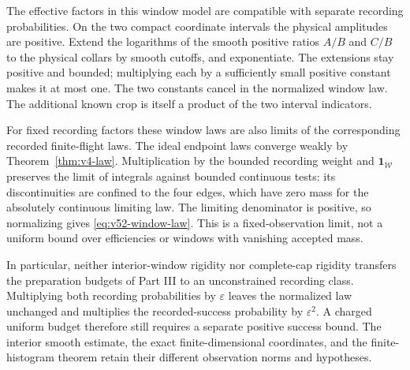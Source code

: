 The effective factors in this window model are compatible with separate
recording probabilities.  On the two compact coordinate intervals the
physical amplitudes are positive.  Extend the logarithms of the smooth
positive ratios $A/B$ and $C/B$ to the physical collars by smooth cutoffs,
and exponentiate.  The extensions stay positive and bounded; multiplying
each by a sufficiently small positive constant makes it at most one.
The two constants cancel in the normalized window law.  The additional
known crop is itself a product of the two interval indicators.

For fixed recording factors these window laws are also limits of the
corresponding recorded finite-flight laws.  The ideal endpoint laws
converge weakly by Theorem~\ref{thm:v4-law}.  Multiplication by the
bounded recording weight and $\mathbf1_{\mathcal W}$ preserves the
limit of integrals against bounded continuous tests: its discontinuities
are confined to the four edges, which have zero mass for the absolutely
continuous limiting law.  The limiting denominator is positive, so
normalizing gives \eqref{eq:v52-window-law}.  This is a fixed-observation
limit, not a uniform bound over efficiencies or windows with vanishing
accepted mass.

In particular, neither interior-window rigidity nor complete-cap rigidity
transfers the preparation budgets of Part III to an unconstrained
recording class.  Multiplying both recording probabilities by
$\varepsilon$ leaves the normalized law unchanged and multiplies the
recorded-success probability by $\varepsilon^2$.  A charged uniform
budget therefore still requires a separate positive success bound.
The interior smooth estimate, the exact finite-dimensional coordinates,
and the finite-histogram theorem retain their different observation
norms and hypotheses.
